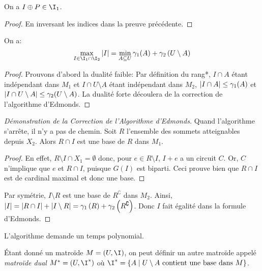 \documentclass[math, info]{cours}
\begin{document}
\begin{lemme}
	On a $I \oplus P \in \I_{1}$.
\end{lemme}
\begin{proof}
	En inversant les indices dans la preuve précédente.
\end{proof}

\begin{thm}
	On a:
	\begin{equation*}
		\max_{I \in \I_{1} \cap \I_{2}} \abs{I} = \min_{A \subseteq U}\gamma_{1}(A) + \gamma_{2}\left(U\setminus A\right)
	\end{equation*}
\end{thm}
\begin{proof}
	Prouvons d'abord la dualité faible:
	Par définition du rang*, $I \cap A$ étant indépendant dans $M_{1}$ et $I\cap U\setminus A$ étant indépendant dans $M_{2}$, $\left|I\cap A\right| \leq \gamma_{1}(A)$ et $\left|I\cap U\setminus A\right| \leq \gamma_{2}(U\setminus A)$.
	La dualité forte découlera de la correction de l'algorithme d'Edmonds.
\end{proof}

\begin{proof}[Démonstration de la Correction de l'Algorithme d'Edmonds]
	Quand l'algorithme s'arrête, il n'y a pas de chemin.
	Soit $R$ l'ensemble des sommets atteignables depuis $X_{2}$.
	Alors $R \cap I$ est une base de $R$ dans $M_{1}$.
	\begin{proof}
		En effet, $R \setminus I \cap X_{1} = \emptyset$ donc, pour $e \in R\setminus I$, $I + e$ a un circuit $C$.
		Or, $C$ n'implique que $e$ et $R\cap I$, puisque $G(I)$ est biparti.
		Ceci prouve bien que $R\cap I$ est de cardinal maximal et donc une base.
	\end{proof}
	Par symétrie, $I\setminus R$ est une base de $R^{\complement}$ dans $M_{2}$.
	Ainsi, $\left|I\right| = \left|R \cap I\right| + \left|I\setminus R\right| = \gamma_{1}\left(R\right) + \gamma_{2}\left(R^{\complement}\right)$.
	Donc $I$ fait égalité dans la formule d'Edmonds.
\end{proof}

\begin{thm}
	L'algorithme demande un temps polynomial.
\end{thm}

\begin{definition}
	Étant donné un matroïde $M = \left(U, \I \right)$, on peut définir un autre matroïde appelé \emph{matroïde dual} $M^{*} = \left(U, \I^{*}\right)$ où $\I^{*} = \left\{A \mid U\setminus A \text{ contient une base dans } M \right\}$.
	\label{def:dualmatroid}
\end{definition}
\end{document}
